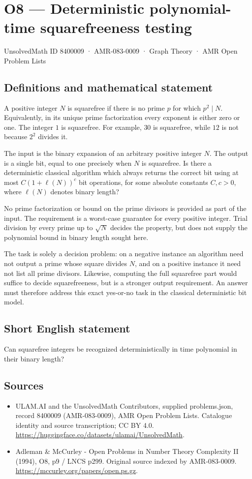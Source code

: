 \documentclass[11pt,a4paper]{article}
\begin{document}
\section*{O8 — Deterministic polynomial-time squarefreeness testing}\label{8400009}
{\small UnsolvedMath ID 8400009 · AMR-083-0009 · Graph Theory · AMR Open Problem Lists}
\subsection{Definitions and mathematical statement}
A positive integer $N$ is squarefree if there is no prime $p$ for which $p^2\mid N$. Equivalently, in its unique prime factorization every exponent is either zero or one. The integer $1$ is squarefree. For example, $30$ is squarefree, while $12$ is not because $2^2$ divides it.

The input is the binary expansion of an arbitrary positive integer $N$. The output is a single bit, equal to one precisely when $N$ is squarefree. Is there a deterministic classical algorithm which always returns the correct bit using at most $C(1+\ell(N))^c$ bit operations, for some absolute constants $C,c>0$, where $\ell(N)$ denotes binary length?

No prime factorization or bound on the prime divisors is provided as part of the input. The requirement is a worst-case guarantee for every positive integer. Trial division by every prime up to $\sqrt N$ decides the property, but does not supply the polynomial bound in binary length sought here.

The task is solely a decision problem: on a negative instance an algorithm need not output a prime whose square divides $N$, and on a positive instance it need not list all prime divisors. Likewise, computing the full squarefree part would suffice to decide squarefreeness, but is a stronger output requirement. An answer must therefore address this exact yes-or-no task in the classical deterministic bit model.
\subsection{Short English statement}
Can squarefree integers be recognized deterministically in time polynomial in their binary length?
\subsection{Sources}
\begin{itemize}
\item[S1] ULAM.AI and the UnsolvedMath Contributors, supplied problems.json, record 8400009 (AMR-083-0009), AMR Open Problem Lists. Catalogue identity and source transcription; CC BY 4.0.
\url{https://huggingface.co/datasets/ulamai/UnsolvedMath}.
\item[S2] Adleman \& McCurley - Open Problems in Number Theory Complexity II (1994), O8, p9 / LNCS p299. Original source indexed by AMR-083-0009.
\url{https://mccurley.org/papers/open.ps.gz}.
\end{itemize}
\end{document}
